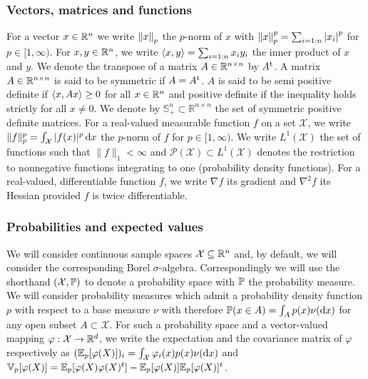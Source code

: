 \subsubsection{Vectors, matrices and functions} 
For a vector $x\in\R^{n}$ we write $\norm{x}{p}$ the $p$-norm of $x$ with $\norm{x}{p}^{p}=\sum_{i=1:n}\abs{x_{i}}^{p}$ for $p\in[1,\infty)$. 
For $x,y\in\R^{n}$, we write $\scal{x,y}=\sum_{i=1:n}x_{i}y_{i}$ the inner product of $x$ and $y$. 
We denote the transpose of a matrix $A\in\R^{n\times n}$ by $A\transp$.
A matrix $A\in\R^{n\times n}$ is said to be symmetric if $A=A\transp$. $A$ is said to be semi positive definite if $\scal{x,Ax}\ge 0$ for all $x\in\R^{n}$ and positive definite if the inequality holds strictly for all $x\neq 0$. We denote by $\mathbb S_+^{n}\subset \mathbb R^{n\times n}$ the set of symmetric positive definite matrices. 
For a real-valued measurable function $f$ on a set $\mathcal X$, we write $\|f\|_{p}^{p}=\int_{\mathcal X} |f(x)|^{p}\dx$ the $p$-norm of $f$ for $p\in[1,\infty)$. 
We write $L^{1}(\mathcal X)$ the set of functions such that $\|f\|_{1}<\infty$ and $\mathcal P(\mathcal X) \subset L^{1}(\mathcal X)$ denotes the restriction to nonnegative functions integrating to one (probability density functions). 
For a real-valued, differentiable function $f$, we write $\nabla f$ its gradient and $\nabla^{2} f$ its Hessian provided $f$ is twice differentiable.

\subsubsection{Probabilities and expected values}
We will consider continuous sample spaces $\mathcal X\subseteq \R^{n}$ and, by default, we will consider the corresponding Borel $\sigma$-algebra. Correspondingly we will use the shorthand $(\mathcal X,\P)$ to denote a probability space with $\P$ the probability measure. We will consider probability measures which admit a probability density function $p$ with respect to a base measure $\nu$ with therefore $\P(x\in A)=\int_{A}p(x)\nudx$ for any open subset $A\subset \mathcal X$. For such a probability space and a vector-valued mapping $\varphi:\mathcal X\to\R^{d}$, we write the expectation and the covariance matrix of $\varphi$ respectively as $(\E_{p}[\varphi(X)])_{i}=\int_{\mathcal X}\varphi_{i}(x)p(x)\nudx$ and $\V_{p}[\varphi(X)]=\E_{p}[\varphi(X)\varphi(X)^{t}]-\E_{p}[\varphi(X)]\E_{p}[\varphi(X)]^{t}$.
 
